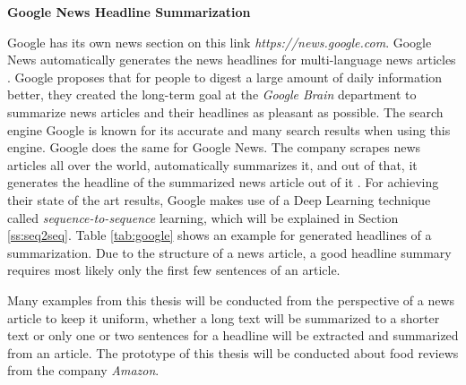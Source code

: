 \textbf{Google News Headline Summarization}

Google has its own news section on this link \textit{https://news.google.com}. Google News automatically generates the news headlines for multi-language news articles \cite{google}. Google proposes that for people to digest a large amount of daily information better, they created the long-term goal at the \textit{Google Brain} department to summarize news articles and their headlines as pleasant as possible. The search engine Google is known for its accurate and many search results when using this engine. Google does the same for Google News. The company scrapes news articles all over the world, automatically summarizes it, and out of that, it generates the headline of the summarized news article out of it \cite{google}. 
For achieving their state of the art results, Google makes use of a Deep Learning technique called \textit{sequence-to-sequence} learning, which will be explained in Section \ref{ss:seq2seq}. Table \ref{tab:google} shows an example for generated headlines of a summarization. Due to the structure of a news article, a good headline summary requires most likely only the first few sentences of an article.  

Many examples from this thesis will be conducted from the perspective of a news article to keep it uniform, whether a long text will be summarized to a shorter text or only one or two sentences for a headline will be extracted and summarized from an article. The prototype of this thesis will be conducted about food reviews from the company \textit{Amazon}. 


